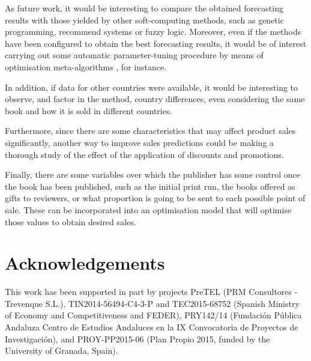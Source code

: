 \documentclass[a4paper,10pt,twocolumn,preprint,3p]{elsarticle}
\begin{document}

As future work, it would be interesting to compare the obtained
forecasting results with those yielded by other soft-computing
methods, such as genetic programming, recommend systems or fuzzy logic. 
Moreover, even if the methods have been configured to obtain the best
forecasting results, it would be of interest carrying out some
automatic parameter-tuning procedure by means of optimisation
meta-algorithms \cite{huang2006ga,Mookiah2013_EA_Tuning,Shen2016_FFly_Tuning}, 
for instance. 

In addition, if data for other countries were available, it would be
interesting to observe, and factor in the method, country differences,
even considering the same book and how it is sold in different
countries. 

Furthermore, since there are some characteristics that may affect product sales 
significantly, another way to improve sales predictions could be making a 
thorough study of the effect of the application of discounts and promotions. 

Finally, there are some variables over which the publisher has some
control once the book has been published, such as the initial print run, 
the books offered as gifts to reviewers, or what proportion is going to be sent 
to each possible point of sale. These can be incorporated into an optimisation 
model that will optimise those values to obtain desired sales. 


\section*{Acknowledgements}

This work has been supported in part by projects PreTEL (PRM Consultores - Trevenque S.L.), TIN2014-56494-C4-3-P and TEC2015-68752 (Spanish Ministry of Economy and Competitiveness and FEDER), PRY142/14 (Fundaci{\'o}n P{\'u}blica Andaluza Centro de Estudios Andaluces en la IX Convocatoria de Proyectos de Investigaci{\'o}n), and PROY-PP2015-06 (Plan Propio 2015, funded by the University of Granada, Spain).




\end{document}
